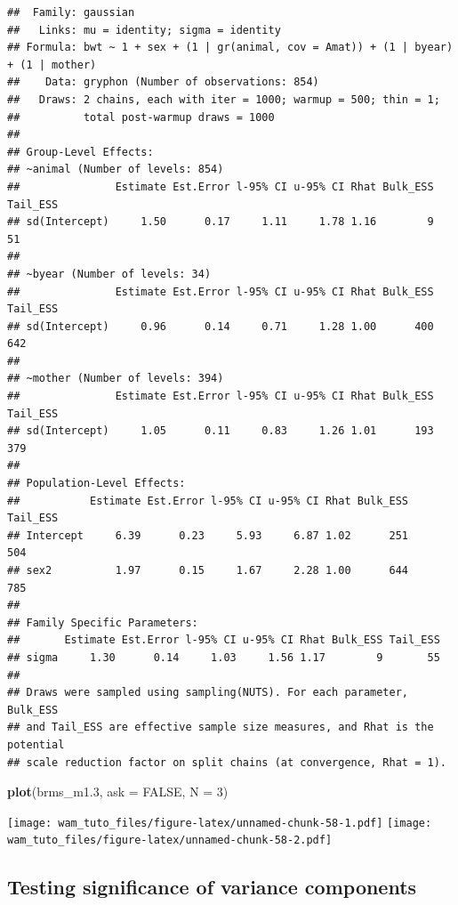 \documentclass[
  12pt,
]{book}
\newenvironment{Shaded}{\begin{snugshade}}{\end{snugshade}}
\newcommand{\DataTypeTok}[1]{\textcolor[rgb]{0.13,0.29,0.53}{#1}}
\newcommand{\DecValTok}[1]{\textcolor[rgb]{0.00,0.00,0.81}{#1}}
\newcommand{\FloatTok}[1]{\textcolor[rgb]{0.00,0.00,0.81}{#1}}
\newcommand{\KeywordTok}[1]{\textcolor[rgb]{0.13,0.29,0.53}{\textbf{#1}}}
\newcommand{\NormalTok}[1]{#1}
\newcommand{\OtherTok}[1]{\textcolor[rgb]{0.56,0.35,0.01}{#1}}
\begin{document}
\begin{verbatim}
##  Family: gaussian 
##   Links: mu = identity; sigma = identity 
## Formula: bwt ~ 1 + sex + (1 | gr(animal, cov = Amat)) + (1 | byear) + (1 | mother) 
##    Data: gryphon (Number of observations: 854) 
##   Draws: 2 chains, each with iter = 1000; warmup = 500; thin = 1;
##          total post-warmup draws = 1000
## 
## Group-Level Effects: 
## ~animal (Number of levels: 854) 
##               Estimate Est.Error l-95% CI u-95% CI Rhat Bulk_ESS Tail_ESS
## sd(Intercept)     1.50      0.17     1.11     1.78 1.16        9       51
## 
## ~byear (Number of levels: 34) 
##               Estimate Est.Error l-95% CI u-95% CI Rhat Bulk_ESS Tail_ESS
## sd(Intercept)     0.96      0.14     0.71     1.28 1.00      400      642
## 
## ~mother (Number of levels: 394) 
##               Estimate Est.Error l-95% CI u-95% CI Rhat Bulk_ESS Tail_ESS
## sd(Intercept)     1.05      0.11     0.83     1.26 1.01      193      379
## 
## Population-Level Effects: 
##           Estimate Est.Error l-95% CI u-95% CI Rhat Bulk_ESS Tail_ESS
## Intercept     6.39      0.23     5.93     6.87 1.02      251      504
## sex2          1.97      0.15     1.67     2.28 1.00      644      785
## 
## Family Specific Parameters: 
##       Estimate Est.Error l-95% CI u-95% CI Rhat Bulk_ESS Tail_ESS
## sigma     1.30      0.14     1.03     1.56 1.17        9       55
## 
## Draws were sampled using sampling(NUTS). For each parameter, Bulk_ESS
## and Tail_ESS are effective sample size measures, and Rhat is the potential
## scale reduction factor on split chains (at convergence, Rhat = 1).
\end{verbatim}

\begin{Shaded}
\begin{Highlighting}[]
\KeywordTok{plot}\NormalTok{(brms\_m1}\FloatTok{.3}\NormalTok{, }\DataTypeTok{ask =} \OtherTok{FALSE}\NormalTok{, }\DataTypeTok{N =} \DecValTok{3}\NormalTok{)}
\end{Highlighting}
\end{Shaded}

\texttt{[image: wam\_tuto\_files/figure-latex/unnamed-chunk-58-1.pdf]} \texttt{[image: wam\_tuto\_files/figure-latex/unnamed-chunk-58-2.pdf]}

\hypertarget{testing-significance-of-variance-components-1}{%
\subsection{Testing significance of variance components}\label{testing-significance-of-variance-components-1}}
\end{document}
